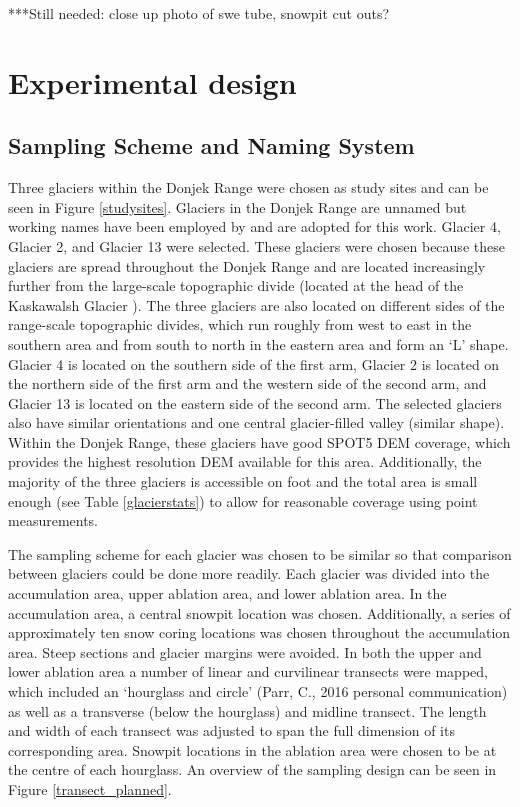 \documentclass{sfuthesis}
\begin{document}
***Still needed: close up photo of swe tube, snowpit cut outs?

\section{Experimental design}
\label{sec:FieldDesign}

\subsection{Sampling Scheme and Naming System}

Three glaciers within the Donjek Range were chosen as study sites and can be seen in Figure \ref{studysites}. Glaciers in the Donjek Range are unnamed but working names have been employed by \cite{Crompton2016} and are adopted for this work. Glacier 4, Glacier 2, and Glacier 13 were selected. These glaciers were chosen because these glaciers are spread throughout the Donjek Range and are located increasingly further from the large-scale topographic divide (located at the head of the Kaskawalsh Glacier \citep{Taylor1969}). The three glaciers are also located on different sides of the range-scale topographic divides, which run roughly from west to east in the southern area and from south to north in the eastern area and form an `L' shape. Glacier 4 is located on the southern side of the first arm, Glacier 2 is located on the northern side of the first arm and the western side of the second arm, and Glacier 13 is located on the eastern side of the second arm. The selected glaciers also have similar orientations and one central glacier-filled valley (similar shape). Within the Donjek Range, these glaciers have good SPOT5 DEM coverage, which provides the highest resolution DEM available for this area. Additionally, the majority of the three glaciers is accessible on foot and the total area is small enough (see Table \ref{glacierstats}) to allow for reasonable coverage using point measurements.

The sampling scheme for each glacier was chosen to be similar so that comparison between glaciers could be done more readily. Each glacier was divided into the accumulation area, upper ablation area, and lower ablation area. In the accumulation area, a central snowpit location was chosen. Additionally, a series of approximately ten snow coring locations was chosen throughout the accumulation area. Steep sections and glacier margins were avoided. In both the upper and lower ablation area a number of linear and curvilinear transects were mapped, which included an `hourglass and circle' (Parr, C., 2016 personal communication) as well as a transverse (below the hourglass) and midline transect. The length and width of each transect was adjusted to span the full dimension of its corresponding area. Snowpit locations in the ablation area were chosen to be at the centre of each hourglass. An overview of the sampling design can be seen in Figure \ref{transect_planned}.
\end{document}

